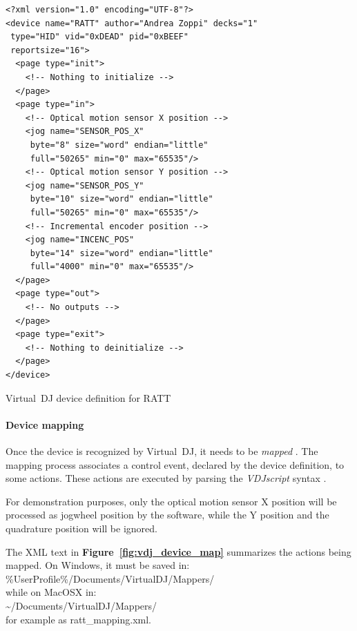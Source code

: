 \documentclass[a4paper,10pt]{article}
\makeatletter
\newenvironment{figurehere}{\def\@captype{figure}\vspace{2ex}}{\vspace{2ex}}
\newcommand{\citef}[1]{\textbf{Figure~\ref{#1}}}
\makeatother
\begin{document}
\begin{multicols}{2}
\begin{figurehere}
\begin{mdframed}[
	innerleftmargin=4pt,
	innerrightmargin=4pt,
	innertopmargin=0pt,
	innerbottommargin=0pt
]
\begin{lstlisting}[language=simpleXML]
<?xml version="1.0" encoding="UTF-8"?>
<device name="RATT" author="Andrea Zoppi" decks="1"
 type="HID" vid="0xDEAD" pid="0xBEEF"
 reportsize="16">
  <page type="init">
    <!-- Nothing to initialize -->
  </page>
  <page type="in">
    <!-- Optical motion sensor X position -->
    <jog name="SENSOR_POS_X"
     byte="8" size="word" endian="little"
     full="50265" min="0" max="65535"/>
    <!-- Optical motion sensor Y position -->
    <jog name="SENSOR_POS_Y"
     byte="10" size="word" endian="little"
     full="50265" min="0" max="65535"/>
    <!-- Incremental encoder position -->
    <jog name="INCENC_POS"
     byte="14" size="word" endian="little"
     full="4000" min="0" max="65535"/>
  </page>
  <page type="out">
    <!-- No outputs -->
  </page>
  <page type="exit">
    <!-- Nothing to deinitialize -->
  </page>
</device>
\end{lstlisting}
\end{mdframed}
\caption{Virtual~DJ device definition for RATT}
\label{fig:vdj_device_def}
\end{figurehere}


\paragraph{Device mapping}
Once the device is recognized by Virtual~DJ, it needs to be \emph{mapped}
\cite{vdj_mapping}. The mapping process associates a control event, declared
by the device definition, to some actions. These actions are executed by
parsing the \emph{VDJscript} syntax \cite{vdj_script}.

For demonstration purposes, only the optical motion sensor X position will be
processed as jogwheel position by the software, while the Y position and the
quadrature position will be ignored.

The XML text in \citef{fig:vdj_device_map} summarizes the actions being
mapped. On Windows, it must be saved in:\\
{\ttfamily\small {\%}UserProfile{\%}/Documents/VirtualDJ/Mappers/}\\
while on MacOSX in:\\
{\ttfamily\small {\textasciitilde}/Documents/VirtualDJ/Mappers/}\\
for example as {\ttfamily\small ratt{\_}mapping.xml}.


\end{multicols}
\end{document}
